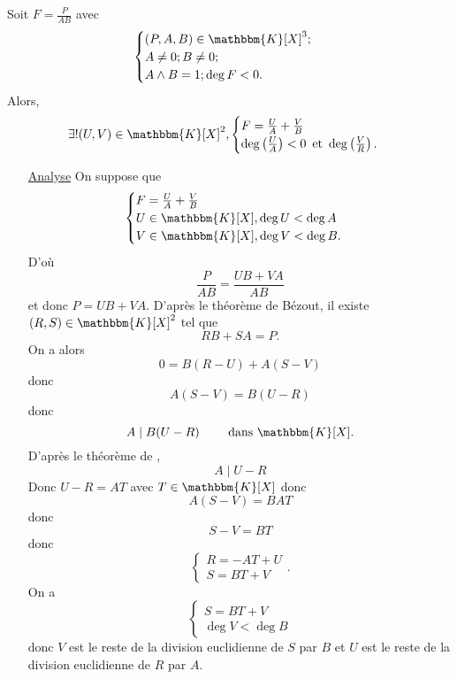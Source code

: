 \begin{lem}
	Soit $F = \frac{P}{AB}$ avec \[
		\begin{cases}
			(P, A, B) \in \mathbbm{K}[X]^3;\\
			A\neq 0; B\neq 0;\\
			A\wedge B = 1;
			\deg F < 0.
		\end{cases}
	\] Alors, \[
		\exists! (U,V) \in \mathbbm{K}[X]^2, \begin{cases}
			F = \frac{U}{A} + \frac{V}{B}\\
			\deg\left( \frac{U}{A} \right) < 0 \et \deg\left( \frac{V}{R} \right).
		\end{cases}
	\]
\end{lem}

\begin{prv}
	\begin{itemize}
		\item[\underline{\sc Analyse}] On suppose que \[
				\begin{cases}
					F = \frac{U}{A} + \frac{V}{B}\\
					U \in \mathbbm{K}[X], \deg U < \deg A\\
					V \in \mathbbm{K}[X], \deg V < \deg B.
				\end{cases}
			\] D'où \[
				\frac{P}{AB} = \frac{UB+VA}{AB}
			\] et donc $P = UB + VA$. D'après le théorème de Bézout, il existe $(R,S) \in \mathbbm{K}[X]^2$ tel que \[
				RB+SA = P.
			\] On a alors \[
				0 = B(R-U) + A(S-V)
			\] donc \[
				A (S-V) = B(U-R)
			\] donc \[
				A  \mid  B(U-R) \qquad \text{ dans }\mathbbm{K}[X].
			\] D'après le théorème de \Gauss, \[
				A  \mid U - R
			\] 
			Donc $U-R = AT$ avec $T \in \mathbbm{K}[X]$ donc \[
				A(S-V) = BAT
			\] donc \[
				S-V = BT
			\] donc \[
				\begin{cases}
					R = -AT + U\\
					S = BT + V
				\end{cases}.
			\]
			On a \[
				\begin{cases}
					S = BT+V\\
					\deg V < \deg B
				\end{cases}
			\] donc $V$ est le reste de la division euclidienne de $S$ par $B$ et $U$ est le reste de la division euclidienne de $R$ par $A$.


\end{itemize}
\end{prv}
